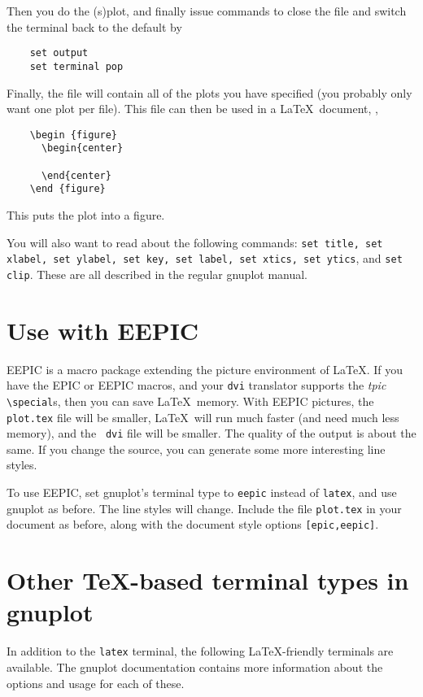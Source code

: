 Then you do the (s)plot, and finally issue commands to close the file and
switch the terminal back to the default by
\begin{verbatim}
    set output
    set terminal pop
\end{verbatim}

Finally, the file will contain all of the plots you have
specified (you probably only want one plot per file). This file can
then be used in a \LaTeX\ document, \eg,

\singlespace
\begin{verbatim}
    \begin {figure}
      \begin{center}
        
      \end{center}
    \end {figure}
\end{verbatim}
\currentspace
This puts the plot into a figure.

You will also want to read about the following commands: {\tt set
title, set xlabel, set ylabel, set key, set label, set xtics, set
ytics}, and {\tt set clip}.  These are all described in the regular
gnuplot manual.

\section{Use with EEPIC}
\label{s:eepic}
EEPIC is a macro package extending the picture environment of \LaTeX.
If you have the EPIC or EEPIC macros, and your {\tt dvi} translator
supports the {\em tpic\/} \verb+\special+s, then you can save \LaTeX\
memory.  With EEPIC pictures, the {\tt plot.tex} file will be smaller,
\LaTeX\ will run much faster (and need much less memory), and the {\tt
dvi} file will be smaller. The quality of the output is about the
same. If you change the source, you can generate some more interesting
line styles.

To use EEPIC, set gnuplot's terminal type to {\tt eepic} instead of
{\tt latex}, and use gnuplot as before. The line styles will change.
Include the file {\tt plot.tex} in your document as before, along with
the document style options {\tt [epic,eepic]}.

\section{Other \TeX-based terminal types in gnuplot}

In addition to the \texttt{latex} terminal, the following \LaTeX-friendly
terminals are available. The gnuplot documentation contains more information
about the options and usage for each of these.

